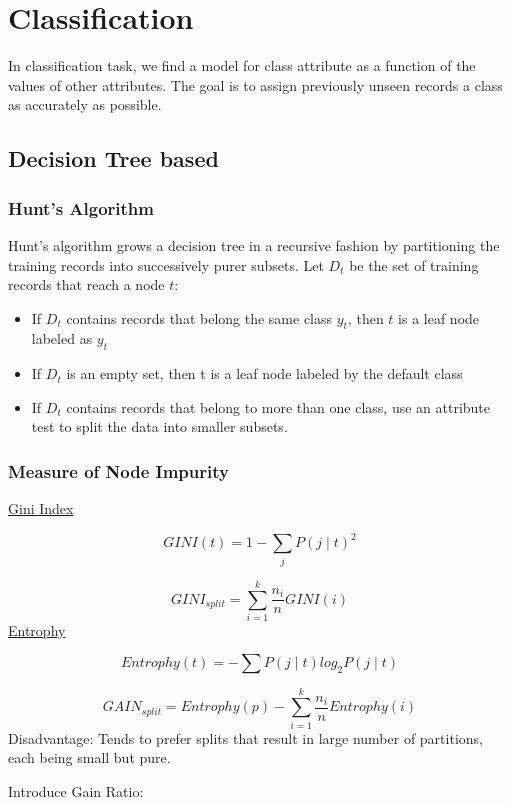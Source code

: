\chapter{Classification}
In classification task, we find a model for class attribute as a function of the values of other attributes. The goal is to assign previously unseen records a class as accurately as possible.

\section{Decision Tree based}

\subsection{Hunt's Algorithm}

Hunt's algorithm grows a decision tree in a recursive fashion by partitioning the training records into successively purer subsets. Let $D_t$ be the set of training records that reach a node $t$:

\begin{itemize}
\item If $D_t$ contains records that belong the same class $y_t$, then $t$ is a leaf node labeled as $y_t$
\item If $D_t$ is an empty set, then t is a leaf node labeled by the default class
\item If $D_t$ contains records that belong to more than one class, use an attribute test to split the data into smaller subsets.
\end{itemize}

\subsection{Measure of Node Impurity}

\underline{Gini Index}

$$GINI(t) = 1 - \sum_{j} P(j\mid t)^{2}$$

$$GINI_{split}=\sum_{i=1}^{k} \frac{n_i}{n} GINI(i)$$
\noindent
\underline{Entrophy} 

$$Entrophy(t)=-\sum P(j \mid t) log_2 P(j \mid t)$$ 

$$GAIN_{split}=Entrophy(p)-\sum_{i=1}^{k} \frac{n_i}{n}Entrophy(i)$$
\noindent
Disadvantage: Tends to prefer splits that result in large number of partitions, each being small but pure. \\
\par \noindent
Introduce Gain Ratio: 

